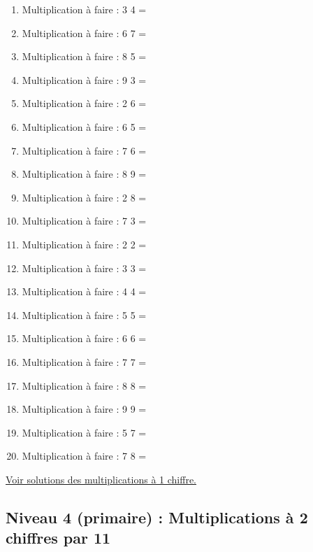 \documentclass[11pt]{article}
\begin{document}
\begin{enumerate}
\item Multiplication à faire :  3\texttimes{} 4 =
\item Multiplication à faire :  6\texttimes{} 7 =
\item Multiplication à faire :  8\texttimes{} 5 =
\item Multiplication à faire :  9\texttimes{} 3 =
\item Multiplication à faire :  2\texttimes{} 6 =
\item Multiplication à faire :  6\texttimes{} 5 =
\item Multiplication à faire :  7\texttimes{} 6 =
\item Multiplication à faire :  8\texttimes{} 9 =
\item Multiplication à faire :  2\texttimes{} 8 =
\item Multiplication à faire :  7\texttimes{} 3 =
\item Multiplication à faire :  2\texttimes{} 2 =
\item Multiplication à faire :  3\texttimes{} 3 =
\item Multiplication à faire :  4\texttimes{} 4 =
\item Multiplication à faire :  5\texttimes{} 5 =
\item Multiplication à faire :  6\texttimes{} 6 =
\item Multiplication à faire :  7\texttimes{} 7 =
\item Multiplication à faire :  8\texttimes{} 8 =
\item Multiplication à faire :  9\texttimes{} 9 =
\item Multiplication à faire :  5\texttimes{} 7 =
\item Multiplication à faire :  7\texttimes{} 8 =
\end{enumerate}




\hyperref[orgaa6a0ba]{Voir solutions des multiplications à 1 chiffre.}




\newpage


\subsection{Niveau 4 (primaire) : Multiplications à 2 chiffres par 11}
\label{sec:org74a9833}
\label{org61e7985}
\end{document}
